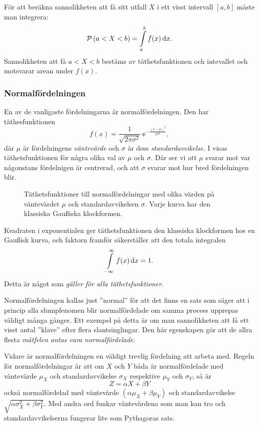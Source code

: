 \documentclass[11pt,a4paper, english, swedish
]{article}
\newcommand{\PP}[1]{\ensuremath\mathcal{P}\left(#1\right)}
\begin{document}
För att beräkna sannolikheten att få sitt utfall $X$ i ett visst
intervall $[a, b]$ måste man integrera:
\begin{equation}
\PP{a<X<b} = \int_a^b f(x) \id{x}.
\end{equation}
Sannolikheten att få $a<X<b$ bestäms av täthetsfunktionen och
intevallet och motsvarar arean under $f(x)$.



\subsubsection{Normalfördelningen}
En av de vanligaste fördelningarna är normalfördelningen. Den
har täthesfunktionen
\begin{equation}
f(x) = \frac{1}{\sqrt{2\pi\sigma^2}} \, \ee^{-\frac{(x-\mu)^2}{2\sigma^2}},
\end{equation}
där $\mu$ är fördelningens \emph{väntevärde} och $\sigma$ är dess
\emph{standardavvikelse}. I  visas
täthetsfunktionen för några olika val av $\mu$ och $\sigma$. Där ser
vi att $\mu$ svarar mot var någonstans fördelnigen är centrerad, och
att $\sigma$ svarar mot hur bred fördelningen blir. 

\begin{figure}
\centering

\caption{Täthetsfunktioner till normalfördelningar med olika värden på
väntevärdet $\mu$ och standardavvikelsen $\sigma$. Varje kurva har den
klassiska Gau\ss{}iska klockformen.}\label{fig:normal_dist}
\end{figure}

Kvadraten i exponentialen ger täthetsfunktionen den
klassiska klockformen hos en Gau\ss{}isk kurva, och faktorn framför
säkerställer att den totala integralen
\begin{equation}
\int_{-\infty}^{\infty} f(x)\id{x} = 1.
\end{equation}
Detta är något som \emph{gäller för alla täthetsfunktioner}. 


Normalfördelningen kallas just ''normal'' för att det finns en sats
som säger att i princip alla slumpfenomen blir normalfördelade om
samma process upprepas väldigt många gånger. Ett exempel på detta är
om man sannolikheten att få ett visst antal ''klave'' efter flera
slantsinglingar. Den här egenskapen gör att de allra flesta 
\emph{mätfelen antas vara normalfördelade}.

Vidare är normalfördelningen en väldigt trevlig fördelning att arbeta
med. Regeln för normalfördelningar är att om $X$ och $Y$ båda är
normalfördelade med väntevärde $\mu_X$ och standardavvikelse
$\sigma_X$ respektive $\mu_Y$ och $\sigma_Y$, så är 
\begin{equation}
Z=\alpha X + \beta Y
\end{equation}
också normalfördelad med väntevärde $(\alpha\mu_X+\beta\mu_Y)$ och
standardavvikelse $\sqrt{\alpha\sigma_X^2 + \beta\sigma_Y^2}$. 
Med andra ord funkar väntevärdena som man kan tro och
standardavvikelserna fungerar lite som Pythagoras sats. 
\end{document}
